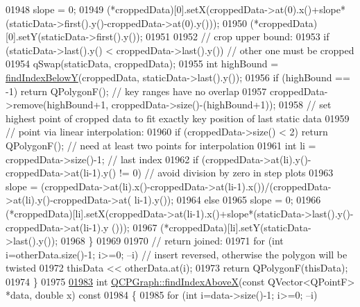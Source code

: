 \begin{DoxyCode}
01948       slope = 0;
01949     (*croppedData)[0].setX(croppedData->at(0).x()+slope*(staticData->first().y()-croppedData->at(0).y()));
01950     (*croppedData)[0].setY(staticData->first().y());
01951     
01952     \textcolor{comment}{// crop upper bound:}
01953     \textcolor{keywordflow}{if} (staticData->last().y() < croppedData->last().y()) \textcolor{comment}{// other one must be cropped}
01954       qSwap(staticData, croppedData);
01955     \textcolor{keywordtype}{int} highBound = \hyperlink{a00031_a6c4d556de3d1e02f548401001f72c6ff}{findIndexBelowY}(croppedData, staticData->last().y());
01956     \textcolor{keywordflow}{if} (highBound == -1) \textcolor{keywordflow}{return} QPolygonF(); \textcolor{comment}{// key ranges have no overlap}
01957     croppedData->remove(highBound+1, croppedData->size()-(highBound+1));
01958     \textcolor{comment}{// set highest point of cropped data to fit exactly key position of last static data}
01959     \textcolor{comment}{// point via linear interpolation:}
01960     \textcolor{keywordflow}{if} (croppedData->size() < 2) \textcolor{keywordflow}{return} QPolygonF(); \textcolor{comment}{// need at least two points for interpolation}
01961     \textcolor{keywordtype}{int} li = croppedData->size()-1; \textcolor{comment}{// last index}
01962     \textcolor{keywordflow}{if} (croppedData->at(li).y()-croppedData->at(li-1).y() != 0) \textcolor{comment}{// avoid division by zero in step plots}
01963       slope = (croppedData->at(li).x()-croppedData->at(li-1).x())/(croppedData->at(li).y()-croppedData->at(
      li-1).y());
01964     \textcolor{keywordflow}{else}
01965       slope = 0;
01966     (*croppedData)[li].setX(croppedData->at(li-1).x()+slope*(staticData->last().y()-croppedData->at(li-1).y
      ()));
01967     (*croppedData)[li].setY(staticData->last().y());
01968   \}
01969   
01970   \textcolor{comment}{// return joined:}
01971   \textcolor{keywordflow}{for} (\textcolor{keywordtype}{int} i=otherData.size()-1; i>=0; --i) \textcolor{comment}{// insert reversed, otherwise the polygon will be twisted}
01972     thisData << otherData.at(i);
01973   \textcolor{keywordflow}{return} QPolygonF(thisData);
01974 \}
01975 
\hypertarget{a00115_source_l01983}{}\hyperlink{a00031_abab2a75b5e63630432bdd1f3b57f07fa}{01983} \textcolor{keywordtype}{int} \hyperlink{a00031_abab2a75b5e63630432bdd1f3b57f07fa}{QCPGraph::findIndexAboveX}(\textcolor{keyword}{const} QVector<QPointF> *data, \textcolor{keywordtype}{double} x)\textcolor{keyword}{ const}
01984 \textcolor{keyword}{}\{
01985   \textcolor{keywordflow}{for} (\textcolor{keywordtype}{int} i=data->size()-1; i>=0; --i)

\end{DoxyCode}
